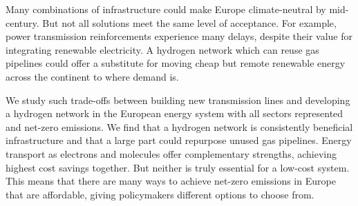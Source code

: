 

Many combinations of infrastructure could make Europe climate-neutral by
mid-century. But not all solutions meet the same level of acceptance. For
example, power transmission reinforcements experience many delays, despite their
value for integrating renewable electricity. A hydrogen network which can reuse
gas pipelines could offer a substitute for moving cheap but remote renewable
energy across the continent to where demand is.

We study such trade-offs between building new transmission lines and developing
a hydrogen network in the European energy system with all sectors represented
and net-zero \co emissions. We find that a hydrogen network is consistently
beneficial infrastructure and that a large part could repurpose unused gas
pipelines. Energy transport as electrons and molecules offer complementary
strengths, achieving highest cost savings together. But neither is truly
essential for a low-cost system. This means that there are many ways to achieve
net-zero emissions in Europe that are affordable, giving policymakers different
options to choose from.
